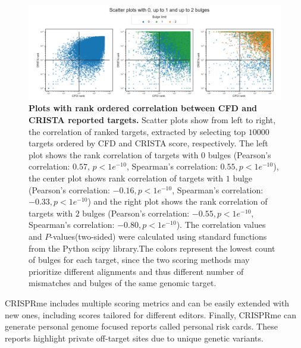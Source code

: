 \documentclass[a4paper, titlepage, openright]{book}
\begin{document}
\begin{figure}
	\centering
	\includegraphics[width=\textwidth]{figures/crisprme3.png}
	\caption[Plots with rank ordered correlation between CFD and CRISTA reported targets]{\textbf{Plots with rank ordered correlation between CFD and CRISTA reported targets.} Scatter plots show from left to right, the correlation of ranked targets, extracted by selecting top $10000$ targets ordered by CFD and CRISTA score, respectively. The left plot shows the rank correlation of targets with $0$ bulges (Pearson’s correlation: $0.57$, $p < 1e^{-10}$, Spearman’s correlation: $0.55, p < 1e^{-10}$), the center plot shows rank correlation of targets with $1$ bulge (Pearson’s correlation: $-0.16, p < 1 e^{-10}$, Spearman’s correlation: $-0.33, p < 1e^{-10}$) and the right plot shows the rank correlation of targets with $2$ bulges (Pearson’s correlation: $-0.55, p < 1e^{-10}$, Spearman’s correlation: $-0.80, p < 1e^{-10}$). The correlation values and $P$-values(two-sided) were calculated using standard functions from the Python scipy library.The colors represent the lowest count of bulges for each target, since the two scoring methods may prioritize different alignments and thus different number of mismatches and bulges of the same genomic target.}
	\label{fig:crisprme3}
\end{figure} 
CRISPRme includes multiple scoring metrics and can be easily extended with new ones, including scores tailored for different editors. Finally, CRISPRme can generate personal genome focused reports called personal risk cards. These reports highlight private off-target sites due to unique genetic variants.
\end{document}
